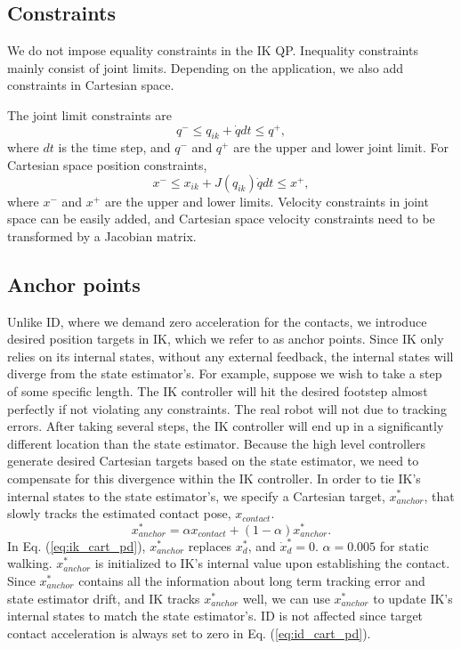 \documentclass{ws-ijhr}
\newcommand{\eref}[1] {Eq. (\ref{#1})}
\begin{document}
\subsection{Constraints}
We do not impose equality constraints in the IK QP. Inequality constraints 
mainly consist of joint limits. Depending on the application, we also add 
constraints in Cartesian space. 

The joint limit constraints are 
\begin{equation}
  q^- \leq q_{ik} + \dot{q}dt \leq q^+,
\end{equation}
where $dt$ is the time step, and $q^-$ and $q^+$ are the upper and lower joint 
limit. 
For Cartesian space position constraints, 
\begin{equation}
  x^- \leq x_{ik} + J(q_{ik})\dot{q}dt \leq x^+,
	\label{eq:ik_cart_ineq}
\end{equation}
where $x^-$ and $x^+$ are the upper and lower limits. 
Velocity constraints in joint space can be easily added, and Cartesian space 
velocity constraints need to be transformed by a Jacobian matrix. 
 
\subsection{Anchor points}
\label{sec:anchor}
Unlike ID, where we demand zero acceleration for the contacts,
we introduce desired position targets in IK, which we refer to as anchor points. 
Since IK only relies on its internal states, without any external feedback, 
the internal states will diverge from the state estimator's.
For example, suppose we wish to take a step of some specific length. 
The IK controller will hit the desired footstep almost perfectly if not 
violating any constraints. The real robot will not due to tracking errors.
After taking several steps, the IK controller will end up in a significantly
different location than the state estimator. 
Because the high level controllers generate desired Cartesian targets 
based on the state estimator, we need to compensate for this 
divergence within the IK controller. 
In order to tie IK's internal states to the state estimator's, we specify a Cartesian
target, $x_{anchor}^*$, that slowly tracks the estimated contact
pose, $x_{contact}$.
\begin{equation}
\label{eq:leaky}
  x_{anchor}^* = \alpha x_{contact} + (1-\alpha)x_{anchor}^*.
\end{equation}
In \eref{eq:ik_cart_pd}, $x_{anchor}^*$ replaces $x^*_d$, and $\dot{x}^*_d = 0$.
$\alpha = 0.005$ for static walking. 
$x_{anchor}^*$ is initialized to IK's internal value upon establishing the contact. 
Since $x_{anchor}^*$ contains all the information about long term tracking error
and state estimator drift, and IK tracks $x_{anchor}^*$ well, we can use 
$x_{anchor}^*$ to update IK's internal states to match the state estimator's. ID is 
not affected since target contact acceleration is always set to zero in \eref{eq:id_cart_pd}.
 
\end{document}
